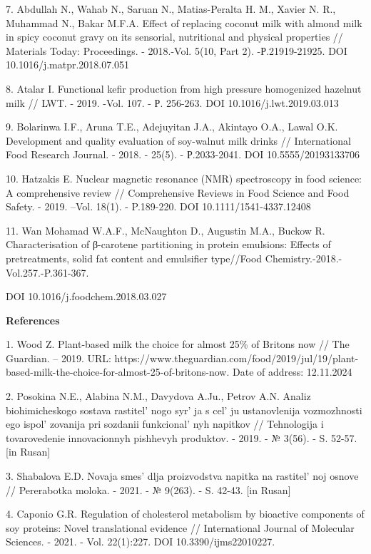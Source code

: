 {7. Abdullah N., Wahab N., Saruan N., Matias-Peralta H. M., Xavier N. R.,
Muhammad N., Bakar M.F.A. Effect of replacing coconut milk with almond
milk in spicy coconut gravy on its sensorial, nutritional and physical
properties // Materials Today: Proceedings. - 2018.-Vol. 5(10, Part 2).
-Р.21919-21925. DOI 10.1016/j.matpr.2018.07.051

8. Atalar I. Functional kefir production from high pressure homogenized
hazelnut milk // LWT. - 2019. -Vol. 107. - Р. 256-263. DOI
10.1016/j.lwt.2019.03.013

9. Bolarinwa I.F., Aruna T.E., Adejuyitan J.A., Akintayo O.A., Lawal
O.K. Development and quality evaluation of soy-walnut milk drinks //
International Food Research Journal. - 2018. - 25(5). - Р.2033-2041. DOI
10.5555/20193133706

10. Hatzakis E. Nuclear magnetic resonance (NMR) spectroscopy in food
science: A comprehensive review // Comprehensive Reviews in Food Science
and Food Safety. - 2019. --Vol. 18(1). - P.189-220. DOI
10.1111/1541-4337.12408

11. Wan Mohamad W.A.F., McNaughton D., Augustin M.A., Buckow R.
Characterisation of β-carotene partitioning in protein emulsions:
Effects of pretreatments, solid fat content and emulsifier type//Food
Chemistry.-2018.-Vol.257.-P.361-367.

DOI 10.1016/j.foodchem.2018.03.027

{\bfseries References}

1. Wood Z. Plant-based milk the choice for almost 25\% of Britons now //
The Guardian. -- 2019. URL:
https://www.theguardian.com/food/2019/jul/19/plant-based-milk-the-choice-for-almost-25-of-britons-now.
Date of address: 12.11.2024

2. Posokina N.E., Alabina N.M., Davydova A.Ju., Petrov A.N. Analiz
biohimicheskogo sostava rastitel' nogo
syr' ja s cel' ju ustanovlenija
vozmozhnosti ego ispol' zovanija pri sozdanii
funkcional' nyh napitkov // Tehnologija i tovarovedenie
innovacionnyh pishhevyh produktov. - 2019. - № 3(56). - S. 52-57. {[}in
Rusan{]}

3. Shabalova E.D. Novaja smes'{} dlja proizvodstva
napitka na rastitel' noj osnove // Pererabotka moloka. -
2021. - № 9(263). - S. 42-43. {[}in Rusan{]}

4. Caponio G.R. Regulation of cholesterol metabolism by bioactive
components of soy proteins: Novel translational evidence //
International Journal of Molecular Sciences. - 2021. - Vol. 22(1):227.
DOI 10.3390/ijms22010227.

}
